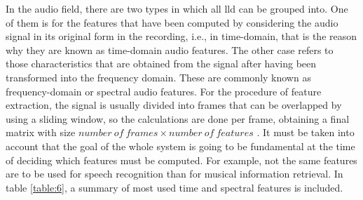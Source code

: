 	In the audio field, there are two types in which all \acrshort{lld} can be grouped into. One of them is for the features that have been computed by considering the audio signal in its original form in the recording, i.e., in time-domain, that is the reason why they are known as time-domain audio features. The other case refers to those characteristics that are obtained from the signal after having been transformed into the frequency domain. These are commonly known as frequency-domain or spectral audio features. For the procedure of feature extraction, the signal is usually divided into frames that can be overlapped by using a sliding window, so the calculations are done per frame, obtaining a final matrix with size $number\ of\ frames \times number\ of\ features$  \cite{Giannakopoulos2014}. It must be taken into account that the goal of the whole system is going to be fundamental at the time of deciding which features must be computed. For example, not the same features are to be used for speech recognition than for musical information retrieval. In table \ref{table:6}, a summary of most used time and spectral features is included.
	
